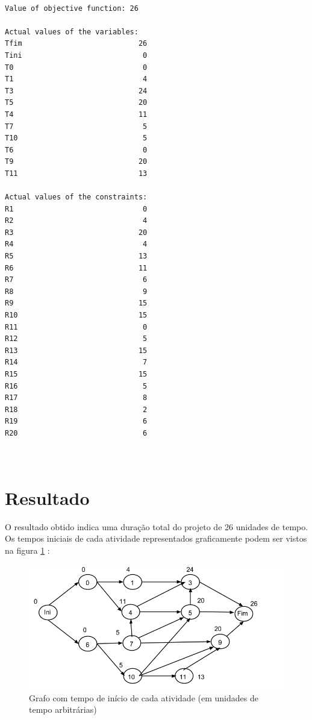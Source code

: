 \begin{verbatim} 

Value of objective function: 26

Actual values of the variables:
Tfim                           26
Tini                            0
T0                              0
T1                              4
T3                             24
T5                             20
T4                             11
T7                              5
T10                             5
T6                              0
T9                             20
T11                            13

Actual values of the constraints:
R1                              0
R2                              4
R3                             20
R4                              4
R5                             13
R6                             11
R7                              6
R8                              9
R9                             15
R10                            15
R11                             0
R12                             5
R13                            15
R14                             7
R15                            15
R16                             5
R17                             8
R18                             2
R19                             6
R20                             6



\end{verbatim}

\section{Resultado}

O resultado obtido indica uma duração total do projeto de 26 unidades de tempo. Os tempos iniciais de cada atividade representados graficamente podem ser vistos na figura \ref{p2:fig:tempos_inicio} :

\begin{figure}[<+htpb+>] \centering
	\includegraphics[scale=0.5]{./img/p2_tempos_inicio} \caption{Grafo com
	tempo de início de cada atividade (em unidades de tempo arbitrárias)}
\label{p2:fig:tempos_inicio}
 \end{figure}

